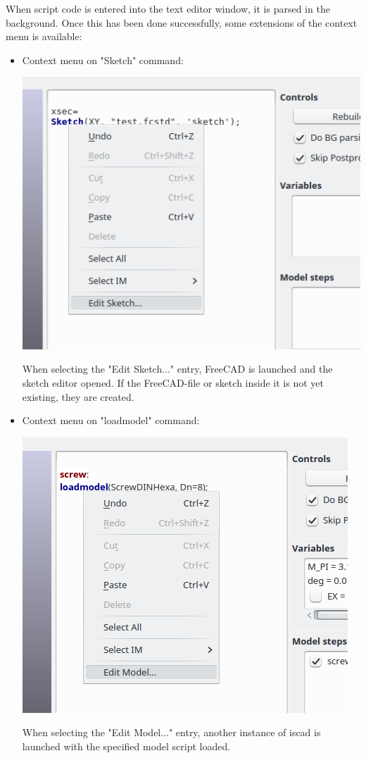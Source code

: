 When script code is entered into the text editor window, it is parsed in
the background. Once this has been done successfully, some extensions of
the context menu is available:

\begin{itemize}
\item Context menu on "Sketch" command:

    \includegraphics[width=\linewidth]{figs/iscad/screenshot_iscad_context_sketch}
    
    When selecting the "Edit Sketch..." entry, FreeCAD is launched and
    the sketch editor opened. If the FreeCAD-file or sketch inside it is
    not yet existing, they are created.
\item Context menu on "loadmodel" command:

    \includegraphics[width=\linewidth]{figs/iscad/screenshot_iscad_context_loadmodel}
    
    When selecting the "Edit Model..." entry, another instance of iscad
    is launched with the specified model script loaded.
\end{itemize}
   
